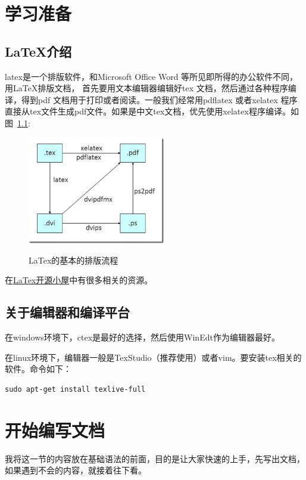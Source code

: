 \documentclass[a4paper,12pt]{ctexbook}
\begin{document}
\begin{flushleft}

\chapter{学习准备}
\section{\LaTeX 介绍~\cite{1994Latex}}
latex是一个排版软件，和Microsoft Office Word 等所见即所得的办公软件不同，用\LaTeX 排版文档，
首先要用文本编辑器编辑好tex 文档，然后通过各种程序编译，得到pdf 文档用于打印或者阅读。一般我们经常用pdflatex
或者xelatex 程序直接从tex文件生成pdf文件。如果是中文tex文档，优先使用xelatex程序编译。如图~\ref{LaTex的基本的排版流程}:
\begin{figure}[H]
\centering
\includegraphics[width=6cm]{Figures/latex_build.png}
\label{LaTex的基本的排版流程}
\caption{LaTex的基本的排版流程}	
\end{figure}
在\hyperref{http://www.latexstudio.net/}{category}{LaTex开源小屋}{LaTex开源小屋}中有很多相关的资源。


\section{关于编辑器和编译平台}
在windows环境下，ctex是最好的选择，然后使用WinEdt作为编辑器最好。

在linux环境下，编辑器一般是TexStudio（推荐使用）或者vim。要安装tex相关的软件。命令如下：
\begin{verbatim}
sudo apt-get install texlive-full
\end{verbatim}


\chapter{开始编写文档}
我将这一节的内容放在基础语法的前面，目的是让大家快速的上手，先写出文档，如果遇到不会的内容，就接着往下看。

\end{flushleft}
\end{document}
